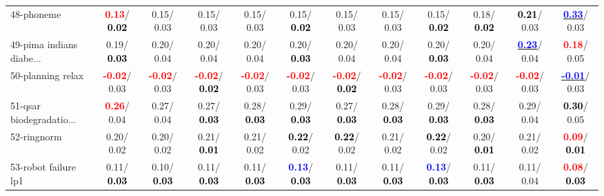 \begin{table}[h]
\begin{center}
{\begin{tabular}{lc|c|c|c|c|c|c|c|c|c|c}
48-phoneme & \textcolor{red}{\textbf{  0.13}}/\textcolor{black}{\textbf{  0.02}} &   0.15/  0.03 &   0.15/  0.03 &   0.15/  0.03 &   0.15/\textcolor{black}{\textbf{  0.02}} &   0.15/  0.03 &   0.15/  0.03 &   0.15/\textcolor{black}{\textbf{  0.02}} &   0.18/\textcolor{black}{\textbf{  0.02}} & \textcolor{black}{\textbf{  0.21}}/  0.03 & \underline{\textcolor{blue}{\textbf{  0.33}}}/  0.03 \\
49-pima indians diabe... &   0.19/\textcolor{black}{\textbf{  0.03}} &   0.20/  0.04 &   0.20/  0.04 &   0.20/  0.04 &   0.20/\textcolor{black}{\textbf{  0.03}} &   0.20/  0.04 &   0.20/  0.04 &   0.20/\textcolor{black}{\textbf{  0.03}} &   0.20/  0.04 & \underline{\textcolor{blue}{\textbf{  0.23}}}/  0.04 & \textcolor{red}{\textbf{  0.18}}/  0.05 \\
50-planning relax & \textcolor{red}{\textbf{ -0.02}}/  0.03 & \textcolor{red}{\textbf{ -0.02}}/  0.03 & \textcolor{red}{\textbf{ -0.02}}/\textcolor{black}{\textbf{  0.02}} & \textcolor{red}{\textbf{ -0.02}}/  0.03 & \textcolor{red}{\textbf{ -0.02}}/  0.03 & \textcolor{red}{\textbf{ -0.02}}/\textcolor{black}{\textbf{  0.02}} & \textcolor{red}{\textbf{ -0.02}}/  0.03 & \textcolor{red}{\textbf{ -0.02}}/  0.03 & \textcolor{red}{\textbf{ -0.02}}/  0.03 & \textcolor{red}{\textbf{ -0.02}}/  0.03 & \underline{\textcolor{blue}{\textbf{ -0.01}}}/  0.03 \\
51-qsar biodegradatio... & \textcolor{red}{\textbf{  0.26}}/  0.04 &   0.27/  0.04 &   0.27/\textcolor{black}{\textbf{  0.03}} &   0.28/\textcolor{black}{\textbf{  0.03}} &   0.29/\textcolor{black}{\textbf{  0.03}} &   0.27/\textcolor{black}{\textbf{  0.03}} &   0.28/\textcolor{black}{\textbf{  0.03}} &   0.29/\textcolor{black}{\textbf{  0.03}} &   0.28/\textcolor{black}{\textbf{  0.03}} &   0.29/  0.04 & \textcolor{black}{\textbf{  0.30}}/  0.05 \\
52-ringnorm &   0.20/  0.02 &   0.20/  0.02 &   0.21/\textcolor{black}{\textbf{  0.01}} &   0.21/  0.02 & \textcolor{black}{\textbf{  0.22}}/  0.02 & \textcolor{black}{\textbf{  0.22}}/  0.02 &   0.21/  0.02 & \textcolor{black}{\textbf{  0.22}}/  0.02 &   0.20/\textcolor{black}{\textbf{  0.01}} &   0.21/  0.02 & \textcolor{red}{\textbf{  0.09}}/\textcolor{black}{\textbf{  0.01}} \\
53-robot failure lp1 &   0.11/\textcolor{black}{\textbf{  0.03}} &   0.10/\textcolor{black}{\textbf{  0.03}} &   0.11/\textcolor{black}{\textbf{  0.03}} &   0.11/\textcolor{black}{\textbf{  0.03}} & \textcolor{blue}{\textbf{  0.13}}/\textcolor{black}{\textbf{  0.03}} &   0.11/\textcolor{black}{\textbf{  0.03}} &   0.11/\textcolor{black}{\textbf{  0.03}} & \textcolor{blue}{\textbf{  0.13}}/\textcolor{black}{\textbf{  0.03}} &   0.11/\textcolor{black}{\textbf{  0.03}} &   0.11/  0.04 & \textcolor{red}{\textbf{  0.08}}/\textcolor{black}{\textbf{  0.03}} \\ \hline

\end{tabular}}
\end{center}
\end{table}
